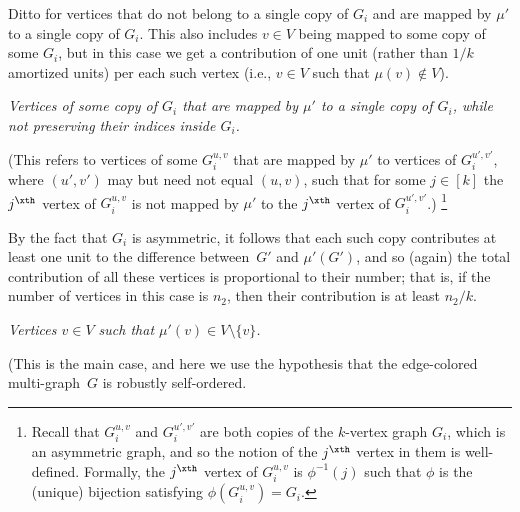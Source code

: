 Ditto for vertices that do not belong to a single copy of $G_i$
and are mapped by $\mu'$ to a single copy of $G_i$.
This also includes $v\in V$ being mapped to some copy of some $G_i$,
but in this case we get a contribution of one unit
(rather than $1/k$ amortized units)
per each such vertex (i.e., $v\in V$ such that $\mu(v)\not\in V$).
%
%
%
%
%
%
%
\item[{\em Case 2}:] {\em Vertices of some copy of $G_i$
that are mapped by $\mu'$ to a single copy of $G_i$,
while not preserving their indices inside $G_i$.}

(This refers to vertices of some $G_i^{u,v}$
that are mapped by $\mu'$ to vertices of $G_i^{u',v'}$,
where $(u',v')$ may but need not equal $(u,v)$,
such that for some $j\in[k]$ the $j^\xth$ vertex of $G_i^{u,v}$
is not mapped by $\mu'$ to the $j^\xth$ vertex of $G_i^{u',v'}$.)
\footnote{Recall that $G_i^{u,v}$ and $G_i^{u',v'}$ are both
copies of the $k$-vertex graph $G_i$, which is an asymmetric graph,
and so the notion of the $j^\xth$ vertex in them is well-defined.
Formally, the $j^\xth$ vertex of $G_i^{u,v}$ is $\phi^{-1}(j)$ such
that $\phi$ is the (unique) bijection satisfying $\phi(G_i^{u,v})=G_i$.}

By the fact that $G_i$ is asymmetric,
it follows that each such copy contributes at least one unit
to the difference between~$G'$ and $\mu'(G')$,
and so (again) the total contribution of all these vertices
is proportional to their number; that is,
if the number of vertices in this case is $n_2$,
then their contribution is at least $n_2/k$.

%
%
\item[{\em Case 3}:]
{\em Vertices $v\in V$ such that $\mu'(v)\in V\setminus\{v\}$.}

(This is the main case, and here we use the hypothesis that
the edge-colored multi-graph~$G$ is robustly self-ordered.

